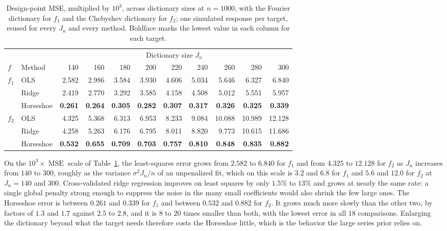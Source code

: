 \begin{table}[ht]
\centering
\small
\setlength{\tabcolsep}{3pt}
\caption{Design-point MSE, multiplied by $10^3$, across dictionary sizes at $n=1000$, with the Fourier dictionary for $f_1$ and the Chebyshev dictionary for $f_2$; one simulated response per target, reused for every $J_n$ and every method. Boldface marks the lowest value in each column for each target.}
\label{tab:mse}
\begin{tabular}{llrrrrrrrrr}
\toprule
 & & \multicolumn{9}{c}{Dictionary size $J_n$} \\
\cmidrule(lr){3-11}
$f$ & Method
& 140 & 160 & 180 & 200 & 220 & 240 & 260 & 280 & 300 \\
\midrule
\multirow{3}{*}{$f_1$}
& OLS
& 2.582 & 2.986 & 3.584 & 3.930 & 4.606 & 5.034 & 5.646 & 6.327 & 6.840 \\
& Ridge
& 2.419 & 2.770 & 3.292 & 3.585 & 4.158 & 4.508 & 5.012 & 5.551 & 5.957 \\
& Horseshoe
& \textbf{0.261} & \textbf{0.264} & \textbf{0.305} & \textbf{0.282} & \textbf{0.307} & \textbf{0.317} & \textbf{0.326} & \textbf{0.325} & \textbf{0.339} \\
\midrule
\multirow{3}{*}{$f_2$}
& OLS
& 4.325 & 5.368 & 6.313 & 6.953 & 8.233 & 9.084 & 10.088 & 10.989 & 12.128 \\
& Ridge
& 4.258 & 5.263 & 6.176 & 6.795 & 8.011 & 8.820 & 9.773 & 10.615 & 11.686 \\
& Horseshoe
& \textbf{0.532} & \textbf{0.655} & \textbf{0.709} & \textbf{0.703} & \textbf{0.757} & \textbf{0.810} & \textbf{0.848} & \textbf{0.835} & \textbf{0.882} \\
\bottomrule
\end{tabular}
\end{table}

On the $10^3\times\operatorname{MSE}$ scale of Table~\ref{tab:mse}, the least-squares error grows from $2.582$ to $6.840$ for $f_1$ and from $4.325$ to $12.128$ for $f_2$ as $J_n$ increases from $140$ to $300$, roughly as the variance $\sigma^2J_n/n$ of an unpenalized fit, which on this scale is $3.2$ and $6.8$ for $f_1$ and $5.6$ and $12.0$ for $f_2$ at $J_n=140$ and $300$. Cross-validated ridge regression improves on least squares by only $1.5\%$ to $13\%$ and grows at nearly the same rate: a single global penalty strong enough to suppress the noise in the many small coefficients would also shrink the few large ones. The Horseshoe error is between $0.261$ and $0.339$ for $f_1$ and between $0.532$ and $0.882$ for $f_2$. It grows much more slowly than the other two, by factors of $1.3$ and $1.7$ against $2.5$ to $2.8$, and it is $8$ to $20$ times smaller than both, with the lowest error in all $18$ comparisons. Enlarging the dictionary beyond what the target needs therefore costs the Horseshoe little, which is the behavior the large series prior relies on.

